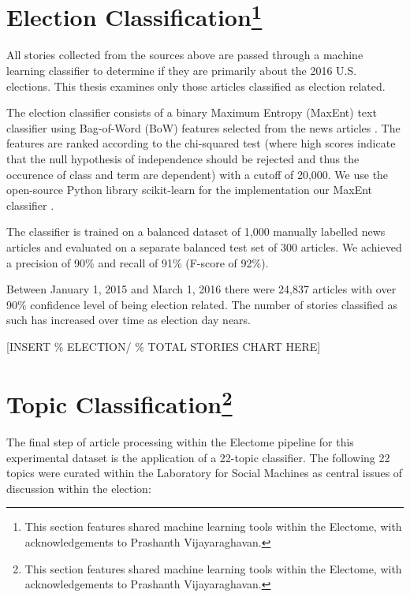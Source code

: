 \section[Election Classification] {Election Classification\footnote{This section features shared machine learning tools within the Electome, with acknowledgements to Prashanth Vijayaraghavan.}}

All stories collected from the sources above are passed through a machine learning classifier to determine if they are primarily about the 2016 U.S. elections. This thesis examines only those articles classified as election related.

The election classifier consists of a binary Maximum Entropy (MaxEnt) text classifier using Bag-of-Word (BoW) features selected from the news articles \cite{nigam1999using}. The features are ranked according to the chi-squared test (where high scores indicate that the null hypothesis of independence should be rejected and thus the occurence of class and term are dependent) with a cutoff of 20,000. We use the open-source Python library scikit-learn for the implementation our MaxEnt classifier \cite{pedregosa2011scikit}.  

The classifier is trained on a balanced dataset of 1,000 manually labelled news articles and evaluated on a separate balanced test set of 300 articles. We achieved a precision of 90\% and recall of 91\% (F-score of 92\%). 

Between January 1, 2015 and March 1, 2016 there were 24,837 articles with over 90\% confidence level of being election related. The number of stories classified as such has increased over time as election day nears. 

[INSERT \% ELECTION/ \% TOTAL STORIES CHART HERE]

\newpage
\section[Topic Classification] {Topic Classification\footnote{This section features shared machine learning tools within the Electome, with acknowledgements to Prashanth Vijayaraghavan.}} 

The final step of article processing within the Electome pipeline for this experimental dataset is the application of a 22-topic classifier. The following 22 topics were curated within the Laboratory for Social Machines as central issues of discussion within the election:

